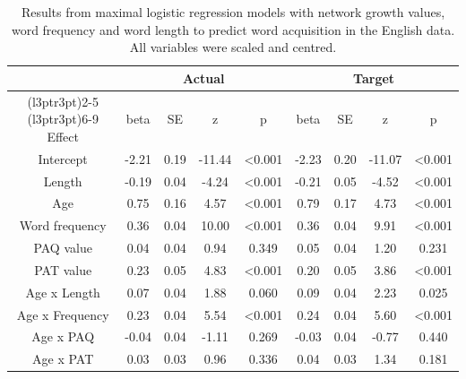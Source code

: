 \documentclass[
  english,
  man,floatsintext]{apa6}
\begin{document}
\begin{longtable}[t]{ccccccccc}
\caption{\label{tab:table-data-summary-providence}Results from maximal logistic regression models with network growth values, word frequency and word length to predict word acquisition in the English data. All variables were scaled and centred.}\\
\toprule
\multicolumn{1}{c}{ } & \multicolumn{4}{c}{Actual} & \multicolumn{4}{c}{Target} \\
\cmidrule(l{3pt}r{3pt}){2-5} \cmidrule(l{3pt}r{3pt}){6-9}
Effect & beta & SE & z & p & beta & SE & z & p\\
\midrule
Intercept & -2.21 & 0.19 & -11.44 & <0.001 & -2.23 & 0.20 & -11.07 & <0.001\\
Length & -0.19 & 0.04 & -4.24 & <0.001 & -0.21 & 0.05 & -4.52 & <0.001\\
Age & 0.75 & 0.16 & 4.57 & <0.001 & 0.79 & 0.17 & 4.73 & <0.001\\
Word frequency & 0.36 & 0.04 & 10.00 & <0.001 & 0.36 & 0.04 & 9.91 & <0.001\\
PAQ value & 0.04 & 0.04 & 0.94 & 0.349 & 0.05 & 0.04 & 1.20 & 0.231\\
\addlinespace
PAT value & 0.23 & 0.05 & 4.83 & <0.001 & 0.20 & 0.05 & 3.86 & <0.001\\
Age x Length & 0.07 & 0.04 & 1.88 & 0.060 & 0.09 & 0.04 & 2.23 & 0.025\\
Age x Frequency & 0.23 & 0.04 & 5.54 & <0.001 & 0.24 & 0.04 & 5.60 & <0.001\\
Age x PAQ & -0.04 & 0.04 & -1.11 & 0.269 & -0.03 & 0.04 & -0.77 & 0.440\\
Age x PAT & 0.03 & 0.03 & 0.96 & 0.336 & 0.04 & 0.03 & 1.34 & 0.181\\
\bottomrule
\end{longtable}
\end{document}
